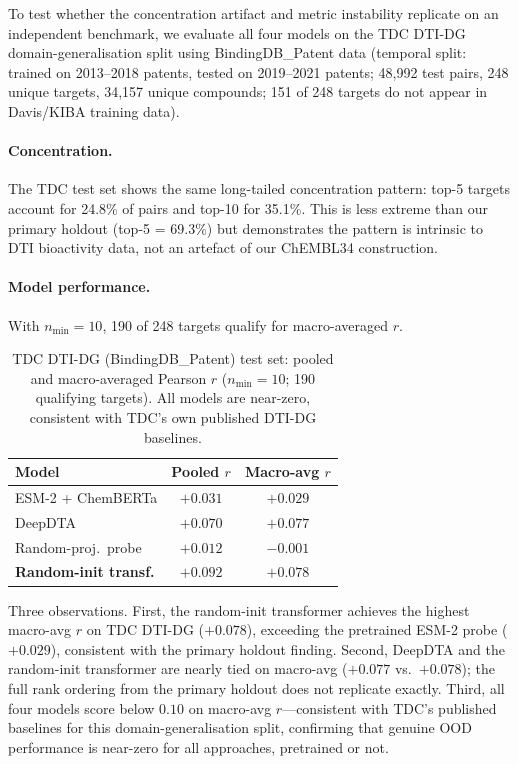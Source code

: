 \documentclass[11pt,a4paper]{article}
\begin{document}
To test whether the concentration artifact and metric instability replicate
on an independent benchmark, we evaluate all four models on the TDC
DTI-DG domain-generalisation split \citep{huang2021moltrans} using
BindingDB\_Patent data (temporal split: trained on 2013--2018 patents,
tested on 2019--2021 patents; 48{,}992 test pairs, 248 unique targets,
34{,}157 unique compounds; 151 of 248 targets do not appear in
Davis/KIBA training data).

\paragraph{Concentration.}
The TDC test set shows the same long-tailed concentration pattern:
top-5 targets account for 24.8\% of pairs and top-10 for 35.1\%.
This is less extreme than our primary holdout (top-5 = 69.3\%) but
demonstrates the pattern is intrinsic to DTI bioactivity data, not
an artefact of our ChEMBL34 construction.

\paragraph{Model performance.}
With $n_\text{min} = 10$, 190 of 248 targets qualify for macro-averaged $r$.

\begin{table}[h]
\centering
\caption{TDC DTI-DG (BindingDB\_Patent) test set: pooled and macro-averaged
Pearson $r$ ($n_\text{min} = 10$; 190 qualifying targets).
All models are near-zero, consistent with TDC's own published DTI-DG
baselines.}
\label{tab:tdc}
\small
\begin{tabular}{lcc}
\toprule
\textbf{Model} & \textbf{Pooled $r$} & \textbf{Macro-avg $r$} \\
\midrule
ESM-2 + ChemBERTa    & $+0.031$ & $+0.029$ \\
DeepDTA              & $+0.070$ & $+0.077$ \\
Random-proj.\ probe  & $+0.012$ & $-0.001$ \\
\textbf{Random-init transf.} & $\mathbf{+0.092}$ & $\mathbf{+0.078}$ \\
\bottomrule
\end{tabular}
\end{table}

Three observations.
First, the random-init transformer achieves the highest macro-avg $r$ on
TDC DTI-DG ($+0.078$), exceeding the pretrained ESM-2 probe ($+0.029$),
consistent with the primary holdout finding.
Second, DeepDTA and the random-init transformer are nearly tied on macro-avg
($+0.077$ vs.\ $+0.078$); the full rank ordering from the primary holdout does
not replicate exactly.
Third, all four models score below $0.10$ on macro-avg $r$---consistent with
TDC's published baselines for this domain-generalisation split, confirming that
genuine OOD performance is near-zero for all approaches, pretrained or not.
\end{document}
